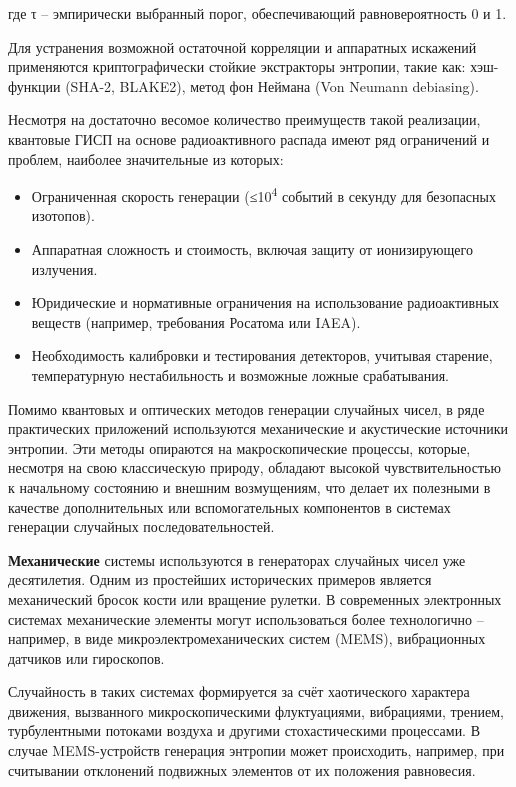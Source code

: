 где τ -- эмпирически выбранный порог, обеспечивающий равновероятность 0
и 1.

Для устранения возможной остаточной корреляции и аппаратных искажений
применяются криптографически стойкие экстракторы энтропии, такие как:
хэш-функции (SHA-2, BLAKE2), метод фон Неймана (Von Neumann debiasing).

Несмотря на достаточно весомое количество преимуществ такой реализации,
квантовые ГИСП на основе радиоактивного распада имеют ряд ограничений и
проблем, наиболее значительные из которых:

\begin{itemize}
\item
  Ограниченная скорость генерации (≤10\textsuperscript{4} событий в
  секунду для безопасных изотопов).
\item
  Аппаратная сложность и стоимость, включая защиту от ионизирующего
  излучения.
\item
  Юридические и нормативные ограничения на использование радиоактивных
  веществ (например, требования Росатома или IAEA).
\item
  Необходимость калибровки и тестирования детекторов, учитывая старение,
  температурную нестабильность и возможные ложные срабатывания.
\end{itemize}


Помимо квантовых и оптических методов генерации случайных чисел, в ряде
практических приложений используются механические и акустические
источники энтропии. Эти методы опираются на макроскопические процессы,
которые, несмотря на свою классическую природу, обладают высокой
чувствительностью к начальному состоянию и внешним возмущениям, что
делает их полезными в качестве дополнительных или вспомогательных
компонентов в системах генерации случайных последовательностей.

\textbf{Механические} системы используются в генераторах случайных чисел
уже десятилетия. Одним из простейших исторических примеров является
механический бросок кости или вращение рулетки. В современных
электронных системах механические элементы могут использоваться более
технологично -- например, в виде микроэлектромеханических систем (MEMS),
вибрационных датчиков или гироскопов.

Случайность в таких системах формируется за счёт хаотического характера
движения, вызванного микроскопическими флуктуациями, вибрациями,
трением, турбулентными потоками воздуха и другими стохастическими
процессами. В случае MEMS-устройств генерация энтропии может
происходить, например, при считывании отклонений подвижных элементов от
их положения равновесия.


